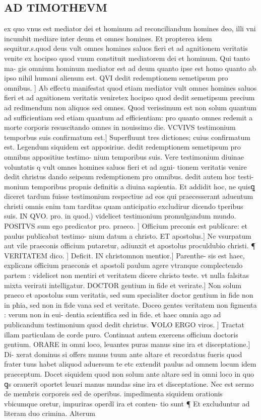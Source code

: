 \documentclass{article}
\begin{document}
\begin{pages}
\section*{AD TIMOTHEVM }\pstart ex quo vnus est mediator dei et hominum ad reconciliandum homines deo, illi vni incumbit mediare inter deum et omnes homines. Et propterea idem sequitur.s.quod deus vult omnes homines saluos fieri et ad agnitionem veritatis venite  ex hocipso quod vnum constituit mediatorem dei et hominum. Qui tanto ma- gis omnium hominum mediator est ad deum quanto ipse est homo  quanto ab ipso nihil humani alienum est. QVI dedit redemptionem semetipsum pro omnibus. ] Ab effectu manifestat quod etiam mediator vult omnes homines saluos fieri et ad agnitionem veritatis veniretex hocipso quod dedit semetipsum precium ad redimendum non aliquos sed omnes. Quod verissimum est non solum quantum ad sufficientiam sed etiam quantum ad efficientiam: pro quanto omnes redemit a morte corporis resuscitando omnes in nouissimo die. VCVIVS testimonium temporbus suis confirmatum est.] Superfluunt tres dictiones; cuius confirmatum est. Legendum siquidem est apposiriue. dedit redemptionem semetipsum pro omnibns appositiue testimo- nium temporibus suis. Vere testimonium diuinae voluntatis q vult omnes homines saluos fieri et ad agni- tionem veritatis venire  dedit christus dando seipsum redemptionem pro omnibus. dedit autem hoc testi- monium temporibus propnis definitis a diuina sapientia. Et addidit hoc, ne quisꝗ diceret tardum fuisse testimonium respectiue ad eos qui praecesserant aduentum christi omnis enim tam tarditas quam anticipatio excludirur dicendo tperibus suis. IN QVO. pro. in quod.) videlicet testimonium promulgandum mundo. POSITVS sum ego predicator pro. praeco. ] Officium preconis est publicare: et paulus publicabat testimo- nium datum a christo. ET apostolus.] Ne vsurpatum aut vile praeconis officium putaretur, adiunxit et apostolus  proculdubio christi. ¶ VERITATEM dico. ] Deficit. IN christomnon mentior.] Parenthe- sis est haec, explicans officium praeconis et apostoli paulum agere vtranque  complectendo partem : videlicet non mentiri et veritatem dicere christo teste. vt nulla falsitas mixta verirati intelligatur. DOCTOR gentium in fide et verirate.] Non solum praeco et apostolus sum veritatis, sed sum specialiter doctor gentium in fide non in pħia, sed non in fide vana  sed et veritate. Doceo gentes veritatem  non figmenta : verum non in eui- dentia scientifica sed in fide. et haec omnia ago ad publicandum testimonium quod dedit christus.  \pend\pstart \huge\textbf{V}\normalsize OLO ERGO viros. ] Tractat illam particulam  de corde puro. Continuat autem exercens officium doctoris gentium. ORARE in omni loco, leuantes puras manus sine ira et disceptatione.] Di- xerat dominus  si offers munus tuum ante altare et recordatus fueris quod frater tuus habet aliquod  aduersum te etc extendit paulus ad omnem locum idem praeceptum. Docet siquidem quod non solum ante altare sed in omni loco in quo ꝗs orauerit oportet leuari manus mundas sine ira et disceptatione. Nec est sermo de membris corporeis sed de operibus. impedimenta siquidem orationis vbicumque  oretur, impuriras operdĩ  ira et conten- tio sunt ¶ Et excluduntur ad literam duo crimina. Alterum 
\end{pages}
\end{document}
